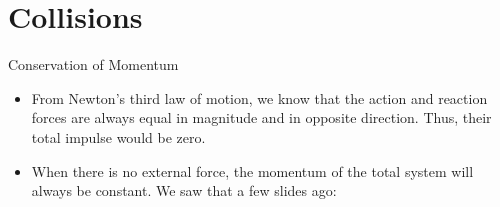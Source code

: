 \documentclass[12pt,compress,aspectratio=169]{beamer}
\newcommand{\mb}[1]{\ensuremath\mathbf{#1}}
\newcommand{\eq}[2]{\vspace{#1}{\Large\begin{displaymath}#2\end{displaymath}}}
\begin{document}


\section{Collisions}

\begin{frame}{Conservation of Momentum}
  \begin{itemize}
  \item From Newton's third law of motion, we know that the action and reaction
    forces are always equal in magnitude and in opposite direction. Thus, their
    total impulse would be zero.
  \item When there is no external force, the momentum of the total system will
    always be constant. We saw that a few slides ago:
    
    \eq{-.2in}{
      \sum_i\mb{p}=\sum_i\mb{p}'
    }
  \end{itemize}
\end{frame}
\end{document}
